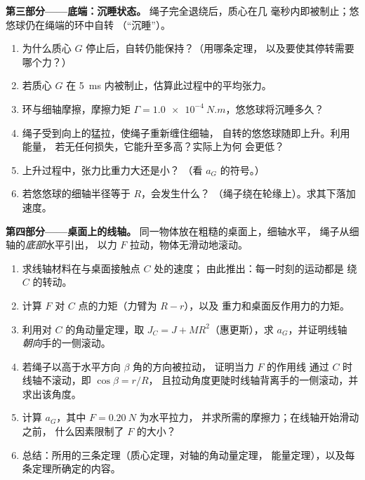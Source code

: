 \begin{problem}
\medskip
\noindent\textbf{第三部分——底端：沉睡状态。}
绳子完全退绕后，质心在几
毫秒内即被制止；悠悠球仍在绳端的环中自转
（“沉睡”）。
\begin{enumerate}[resume]
  \item 为什么质心 $G$ 停止后，自转仍能保持？（用哪条定理，
        以及要使其停转需要哪个力？）
  \item 若质心 $G$ 在
        \qty{5}{ms} 内被制止，估算此过程中的平均张力。
  \item 环与细轴摩擦，摩擦力矩 $\Gamma =
        \qty{1.0e-4}{N.m}$，悠悠球将沉睡多久？
  \item 绳子受到向上的猛拉，使绳子重新缠住细轴，
        自转的悠悠球随即上升。利用能量，
        若无任何损失，它能升至多高？实际上为何
        会更低？
  \item 上升过程中，张力比重力大还是小？
        （看 $a_G$ 的符号。）
  \item 若悠悠球的细轴半径等于 $R$，会发生什么？
        （绳子绕在轮缘上）。求其下落加速度。
\end{enumerate}

\medskip
\noindent\textbf{第四部分——桌面上的线轴。}
同一物体放在粗糙的桌面上，细轴水平，
绳子从细轴的\emph{底部}水平引出，
以力 $F$ 拉动，物体无滑动地滚动。
\begin{enumerate}[resume]
  \item 求线轴材料在与桌面接触点 $C$ 处的速度；
        由此推出：每一时刻的运动都是
        绕 $C$ 的转动。
  \item 计算 $F$ 对 $C$ 点的力矩（力臂为 $R - r$），以及
        重力和桌面反作用力的力矩。
  \item 利用对 $C$ 的角动量定理，取 $J_C = J +
        MR^2$（惠更斯），求 $a_G$，并证明线轴
        \emph{朝向}手的一侧滚动。
  \item 若绳子以高于水平方向 $\beta$ 角的方向被拉动，
        证明当力 $F$ 的作用线
        通过 $C$ 时线轴不滚动，即 $\cos\beta = r/R$，
        且拉动角度更陡时线轴背离手的一侧滚动，并求出该角度。
  \item 计算 $a_G$，其中 $F = \qty{0.20}{N}$ 为水平拉力，
        并求所需的摩擦力；在线轴开始滑动之前，
        什么因素限制了 $F$ 的大小？
  \item 总结：所用的三条定理（质心定理，对轴的角动量定理，
        能量定理），以及每条定理所确定的内容。
\end{enumerate}
\end{problem}
